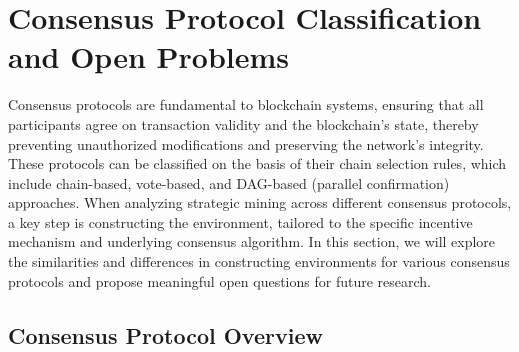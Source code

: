 \section{Consensus Protocol Classification and Open Problems}
\label{sec:consensus}

Consensus protocols are fundamental to blockchain systems, ensuring that all participants agree on transaction validity and the blockchain’s state, thereby preventing unauthorized modifications and preserving the network’s integrity. 
These protocols can be classified on the basis of their chain selection rules, which include chain-based, vote-based, and DAG-based (parallel confirmation) approaches.
When analyzing strategic mining across different consensus protocols, a key step is constructing the environment, tailored to the specific incentive mechanism and underlying consensus algorithm. 
In this section, we will explore the similarities and differences in constructing environments for various consensus protocols and propose meaningful open questions for future research.

\subsection{Consensus Protocol Overview}

